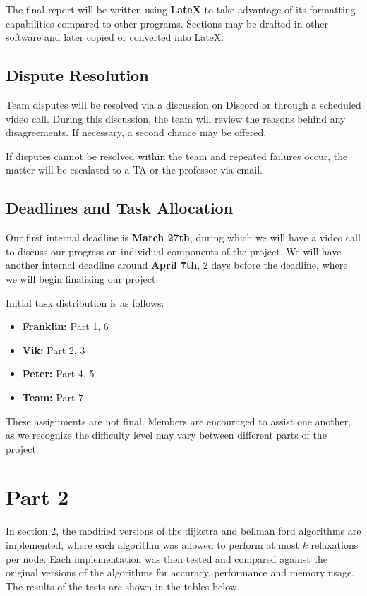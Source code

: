 \documentclass{article}
\begin{document}
\begin{onehalfspace}
{The final report will be written using \textbf{LateX} to take advantage of its formatting capabilities compared to other programs. Sections may be drafted in other software and later copied or converted into LateX.

\subsection*{Dispute Resolution}

Team disputes will be resolved via a discussion on Discord or through a scheduled video call. During this discussion, the team will review the reasons behind any disagreements. If necessary, a second chance may be offered. 

If disputes cannot be resolved within the team and repeated failures occur, the matter will be escalated to a TA or the professor via email.

\subsection*{Deadlines and Task Allocation}

Our first internal deadline is \textbf{March 27th}, during which we will have a video call to discuss our progress on individual components of the project. We will have another internal deadline around \textbf{April 7th}, 2 days before the deadline, where we will begin finalizing our project.

Initial task distribution is as follows:

\begin{itemize}[leftmargin=1.5cm]
    \item \textbf{Franklin:} Part 1, 6
    \item \textbf{Vik:} Part 2, 3
    \item \textbf{Peter:} Part 4, 5
    \item \textbf{Team:} Part 7
\end{itemize}

These assignments are not final. Members are encouraged to assist one another, as we recognize the difficulty level may vary between different parts of the project.}
\newpage

\section*{Part 2}
In section 2, the modified versions of the dijkstra and bellman ford algorithms are implemented, where each algorithm was allowed to perform at most $k$ relaxations per node. Each implementation
was then tested and compared against the original versions of the algorithms for accuracy, performance and memory usage. The results of the tests are shown in the tables below.


\end{onehalfspace}
\end{document}
